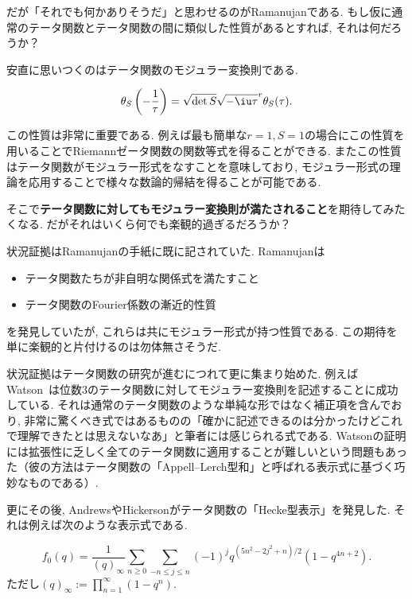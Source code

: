 \documentclass[11pt,b5paper,oneside,lualatex]{ltjsarticle} %
\numberwithin{equation}{section} %
\begin{document}
だが「それでも何かありそうだ」と思わせるのがRamanujanである. 
もし仮に通常のテータ関数とテータ関数の間に類似した性質があるとすれば, それは何だろうか？

安直に思いつくのはテータ関数のモジュラー変換則である. 

\begin{prop}
	\[
	\theta_S \left( -\frac{1}{\tau} \right) =
	\sqrt{\det S} \sqrt{-\iu \tau}^r \theta_S (\tau).
	\]
\end{prop}

この性質は非常に重要である. 
例えば最も簡単な$ r = 1, S = 1 $の場合にこの性質を用いることでRiemannゼータ関数の関数等式を得ることができる. 
またこの性質はテータ関数がモジュラー形式をなすことを意味しており, モジュラー形式の理論を応用することで様々な数論的帰結を得ることが可能である. 

そこで\textbf{テータ関数に対してもモジュラー変換則が満たされること}を期待してみたくなる. 
だがそれはいくら何でも楽観的過ぎるだろうか？

状況証拠はRamanujanの手紙に既に記されていた. 
Ramanujanは
\begin{itemize}
	\item {}テータ関数たちが非自明な関係式を満たすこと
	\item {}テータ関数のFourier係数の漸近的性質
\end{itemize}
を発見していたが, これらは共にモジュラー形式が持つ性質である. 
この期待を単に楽観的と片付けるのは勿体無さそうだ. 

状況証拠はテータ関数の研究が進むにつれて更に集まり始めた. 
例えばWatson~\cite[pp. 78]{Watson}は位数$ 3 $のテータ関数に対してモジュラー変換則を記述することに成功している. 
それは通常のテータ関数のような単純な形ではなく補正項を含んでおり, 非常に驚くべき式ではあるものの「確かに記述できるのは分かったけどこれで理解できたとは思えないなあ」と筆者には感じられる式である. 
Watsonの証明には拡張性に乏しく全てのテータ関数に適用することが難しいという問題もあった（彼の方法はテータ関数の「Appell--Lerch型和」と呼ばれる表示式に基づく巧妙なものである）. 

更にその後, AndrewsやHickersonがテータ関数の「Hecke型表示」を発見した. 
それは例えば次のような表示式である. 

\begin{thm}
	\[
	f_0 (q) = \frac{1}{(q)_\infty}
	\sum_{n \ge 0} \sum_{-n \le j \le n} (-1)^j q^{(5n^2 - 2j^2 + n)/2} (1 - q^{4n+2}).
	\]
	ただし$ (q)_\infty := \prod_{n=1}^{\infty} (1 - q^n) $.
\end{thm}
\end{document}
